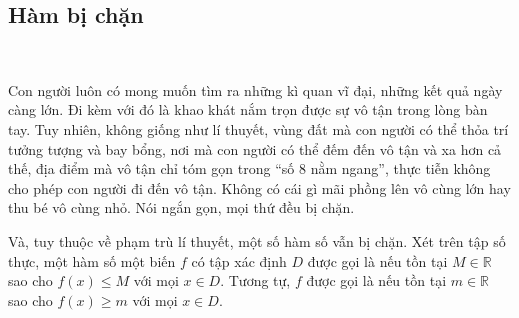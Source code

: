 \subsection{Hàm bị chặn}

\ %

Con người luôn có mong muốn tìm ra những kì quan vĩ đại, những kết quả ngày càng lớn. Đi kèm với đó là khao khát nắm trọn được sự vô tận trong lòng bàn tay. Tuy nhiên, không giống như lí thuyết, vùng đất mà con người có thể thỏa trí tưởng tượng và bay bổng, nơi mà con người có thể đếm đến vô tận và xa hơn cả thế, địa điểm mà vô tận chỉ tóm gọn trong ``số $8$ nằm ngang'', thực tiễn không cho phép con người đi đến vô tận. Không có cái gì mãi phồng lên vô cùng lớn hay thu bé vô cùng nhỏ. Nói ngắn gọn, mọi thứ đều bị chặn.

Và, tuy thuộc về phạm trù lí thuyết, một số hàm số vẫn bị chặn. Xét trên tập số thực, một hàm số một biến $f$ có tập xác định $D$ được gọi là  nếu tồn tại $M \in \mathbb{R}$ sao cho $f(x) \leq M$ với mọi $x \in D$. Tương tự, $f$ được gọi là  nếu tồn tại $m \in \mathbb{R}$ sao cho $f(x) \geq m$ với mọi $x \in D$. 